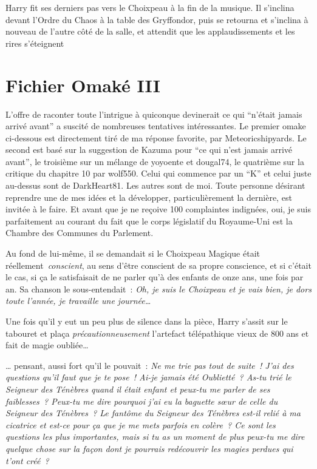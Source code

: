 {Harry fit ses derniers pas vers le Choixpeau à la fin de la musique. Il s'inclina devant l'Ordre du Chaos à la table des Gryffondor, puis se retourna et s'inclina à nouveau de l'autre côté de la salle, et attendit que les applaudissements et les rires s'éteignent~

\section{Fichier Omaké III}

L'offre de raconter toute l'intrigue à quiconque devinerait ce qui “n'était jamais arrivé avant” a suscité de nombreuses tentatives intéressantes. Le premier omake ci-dessous est directement tiré de ma réponse favorite, par Meteoricshipyards. Le second est basé sur la suggestion de Kazuma pour “ce qui n'est jamais arrivé avant”, le troisième sur un mélange de yoyoente et dougal74, le quatrième sur la critique du chapitre 10 par wolf550. Celui qui commence par un “K” et celui juste au-dessus sont de DarkHeart81. Les autres sont de moi. Toute personne désirant reprendre une de mes idées et la développer, particulièrement la dernière, est invitée à le faire. Et avant que je ne reçoive 100 complaintes indignées, oui, je suis parfaitement au courant du fait que le corps législatif du Royaume-Uni est la Chambre des Communes du Parlement.

\later

Au fond de lui-même, il se demandait si le Choixpeau Magique était réellement~\emph{conscient}, au sens d'être conscient de sa propre conscience, et si c'était le cas, si ça le satisfaisait de ne parler qu'à des enfants de onze ans, une fois par an. Sa chanson le sous-entendait~: \emph{Oh, je suis le Choixpeau et je vais bien, je dors toute l'année, je travaille une journée…}

Une fois qu'il y eut un peu plus de silence dans la pièce, Harry s'assit sur le tabouret et plaça \emph{précautionneusement} l'artefact télépathique vieux de 800 ans et fait de magie oubliée…

… pensant, aussi fort qu'il le pouvait~: \emph{Ne me trie pas tout de suite~! J'ai des questions qu'il faut que je te pose~! Ai-je jamais été Oublietté~? As-tu trié le Seigneur des Ténèbres quand il était enfant et peux-tu me parler de ses faiblesses~? Peux-tu me dire pourquoi j'ai eu la baguette sœur de celle du Seigneur des Ténèbres~? Le fantôme du Seigneur des Ténèbres est-il relié à ma cicatrice et est-ce pour ça que je me mets parfois en colère~? Ce sont les questions les plus importantes, mais si tu as un moment de plus peux-tu me dire quelque chose sur la façon dont je pourrais redécouvrir les magies perdues qui t'ont créé~?}

}
